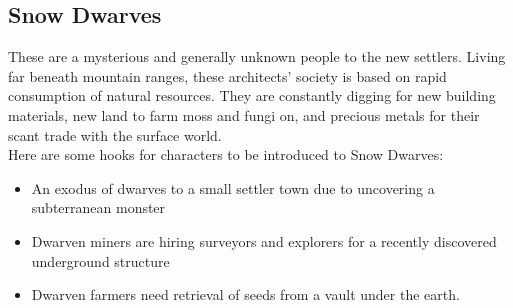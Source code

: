 \documentclass[notitlepage]{article}
\begin{document}
\begin{multicols}{2}
  \subsection*{Snow Dwarves}

  These are a mysterious and generally unknown people to the new settlers.
  Living far beneath mountain ranges, these architects' society is based on rapid consumption of natural resources.
  They are constantly digging for new building materials, new land to farm moss and fungi on, and precious metals for their scant trade with the surface world. \\

  Here are some hooks for characters to be introduced to Snow Dwarves:

  \begin{itemize}
  \item An exodus of dwarves to a small settler town due to uncovering a subterranean monster
  \item Dwarven miners are hiring surveyors and explorers for a recently discovered underground structure
  \item Dwarven farmers need retrieval of seeds from a vault under the earth.
  \end{itemize}

\end{multicols}
\end{document}
